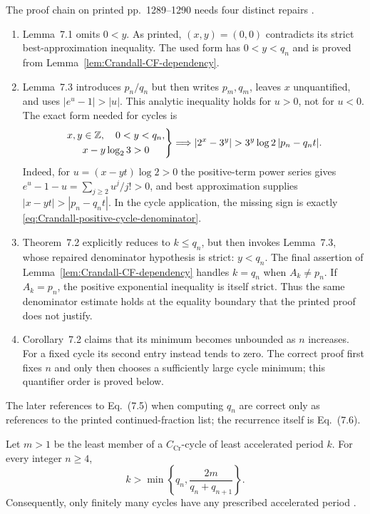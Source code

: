\begin{sourceissue}
\label{sourceissue:Crandall-continued-fraction-chain}
The proof chain on printed pp.~1289--1290 needs four distinct repairs
\cite[pp.~1289--1290]{Crandall1978}.
\begin{enumerate}[label=(\roman*)]
\item Lemma~7.1 omits $0<y$.  As printed, $(x,y)=(0,0)$ contradicts its
strict best-approximation inequality.  The used form has $0<y<q_n$ and is
proved from Lemma~\ref{lem:Crandall-CF-dependency}.
\item Lemma~7.3 introduces $p_n/q_n$ but then writes $p_m,q_m$, leaves $x$
unquantified, and uses $|e^u-1|>|u|$.  This analytic inequality holds for
$u>0$, not for $u<0$.  The exact form needed for cycles is
\begin{equation}
\label{eq:Crandall-repaired-exponential-bound}
 \left.
 \begin{gathered}
  x,y\in\Z,\quad 0<y<q_n,\\
  x-y\log_2 3>0
 \end{gathered}
 \right\}
 \Longrightarrow
 |2^x-3^y|>3^y\log2\,|p_n-q_nt|.
\end{equation}
Indeed, for $u=(x-yt)\log2>0$ the positive-term power series gives
$e^u-1-u=\sum_{j\geq2}u^j/j!>0$, and best approximation supplies
$|x-yt|>|p_n-q_nt|$.  In the cycle application, the missing sign is exactly
\eqref{eq:Crandall-positive-cycle-denominator}.
\item Theorem~7.2 explicitly reduces to $k\leq q_n$, but then invokes
Lemma~7.3, whose repaired denominator hypothesis is strict: $y<q_n$.
The final assertion of Lemma~\ref{lem:Crandall-CF-dependency} handles
$k=q_n$ when $A_k\ne p_n$.  If $A_k=p_n$, the positive exponential
inequality is itself strict.  Thus the same denominator estimate holds at
the equality boundary that the printed proof does not justify.
\item Corollary~7.2 claims that its minimum becomes unbounded as $n$
increases.  For a fixed cycle its second entry instead tends to zero.  The
correct proof first fixes $n$ and only then chooses a sufficiently large
cycle minimum; this quantifier order is proved below.
\end{enumerate}
The later references to Eq.~(7.5) when computing $q_n$ are correct only as
references to the printed continued-fraction list; the recurrence itself is
Eq.~(7.6).
\end{sourceissue}

\begin{theorem}
\label{thm:Crandall-cycle-bound}
Let $m>1$ be the least member of a $C_{\mathrm{Cr}}$-cycle of least
accelerated period $k$.  For every integer $n\geq4$,
\begin{equation}
\label{eq:Crandall-cycle-bound}
 k>\min\left\{q_n,\frac{2m}{q_n+q_{n+1}}\right\}.
\end{equation}
Consequently, only finitely many cycles have any prescribed accelerated
period \cite[p.~1290]{Crandall1978}.
\end{theorem}

